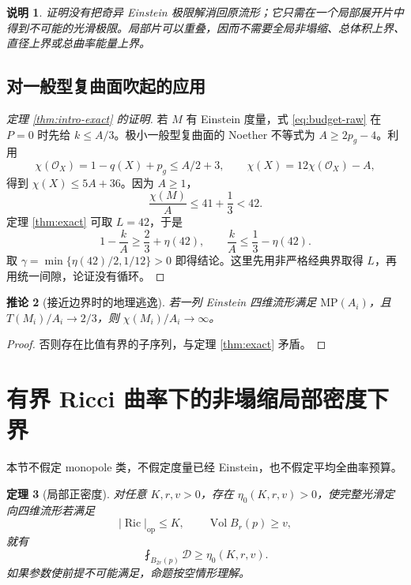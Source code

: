\documentclass[UTF8,fontset=fandol,zihao=-4]{ctexart}
\theoremstyle{cn}
\newtheorem{theorem}{定理}[section]
\newtheorem{corollary}[theorem]{推论}
\newtheorem{remark}[theorem]{说明}
\DeclareMathOperator{\Ric}{Ric}
\DeclareMathOperator{\Vol}{Vol}
\newcommand{\op}{\mathrm{op}}
\newcommand{\av}{\fint}
\newcommand{\Dcal}{\mathcal D}
\numberwithin{equation}{section}
\begin{document}
\begin{remark}
证明没有把奇异 Einstein 极限解消回原流形；它只需在一个局部展开片中得到不可能的光滑极限。局部片可以重叠，因而不需要全局非塌缩、总体积上界、直径上界或总曲率能量上界。
\end{remark}

\subsection{对一般型复曲面吹起的应用}

\begin{proof}[定理 \ref{thm:intro-exact} 的证明]
若 $M$ 有 Einstein 度量，式 \eqref{eq:budget-raw} 在 $P=0$ 时先给 $k\le A/3$。极小一般型复曲面的 Noether 不等式为 $A\ge2p_g-4$\cite{liedtke}。利用
\[
\chi(\mathcal O_X)=1-q(X)+p_g\le A/2+3,
\qquad \chi(X)=12\chi(\mathcal O_X)-A,
\]
得到 $\chi(X)\le5A+36$。因为 $A\ge1$，
\[
\frac{\chi(M)}A\le41+\frac13<42.
\]
定理 \ref{thm:exact} 可取 $L=42$，于是
\[
1-\frac{k}{A}\ge\frac23+\eta(42),\qquad
\frac{k}{A}\le\frac13-\eta(42).
\]
取 $\gamma=\min\{\eta(42)/2,1/12\}>0$ 即得结论。这里先用非严格经典界取得 $L$，再用统一间隙，论证没有循环。
\end{proof}

\begin{corollary}[接近边界时的地理逃逸]
若一列 Einstein 四维流形满足 $\mathrm{MP}(A_i)$，且
$T(M_i)/A_i\to2/3$，则 $\chi(M_i)/A_i\to\infty$。
\end{corollary}
\begin{proof}
否则存在比值有界的子序列，与定理 \ref{thm:exact} 矛盾。
\end{proof}

\section{有界 Ricci 曲率下的非塌缩局部密度下界}

本节不假定 monopole 类，不假定度量已经 Einstein，也不假定平均全曲率预算。

\begin{theorem}[局部正密度]\label{thm:local}
对任意 $K,r,v>0$，存在 $\eta_0(K,r,v)>0$，使完整光滑定向四维流形若满足
\[
|\Ric|_{\op}\le K,\qquad \Vol B_r(p)\ge v,
\]
就有
\begin{equation}\label{eq:local-floor}
\av_{B_{2r}(p)}\Dcal\ge\eta_0(K,r,v).
\end{equation}
如果参数使前提不可能满足，命题按空情形理解。
\end{theorem}
\end{document}
